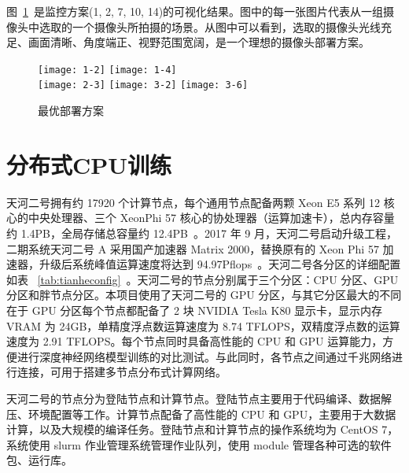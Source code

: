 图~\ref{fig:rlresult}~是监控方案(1, 2, 7, 10, 14)的可视化结果。图中的每一张图片代表从一组摄像头中选取的一个摄像头所拍摄的场景。从图中可以看到，选取的摄像头光线充足、画面清晰、角度端正、视野范围宽阔，是一个理想的摄像头部署方案。

\begin{figure}[!ht]
    \centering
    \texttt{[image: 1-2]}
    \texttt{[image: 1-4]}\\
    \texttt{[image: 2-3]}
    \texttt{[image: 3-2]}
    \texttt{[image: 3-6]}
    \caption{最优部署方案}
    \label{fig:rlresult}
\end{figure}

\section{分布式CPU训练}

天河二号拥有约 17920 个计算节点，每个通用节点配备两颗 Xeon E5 系列 12 核心的中央处理器、三个 XeonPhi 57 核心的协处理器（运算加速卡），总内存容量约 1.4PB，全局存储总容量约 12.4PB~\cite{tianhe2018config}。2017 年 9 月，天河二号启动升级工程，二期系统天河二号 A 采用国产加速器 Matrix 2000，替换原有的 Xeon Phi 57 加速器，升级后系统峰值运算速度将达到 94.97Pflops~\cite{tianhe2017summary}。天河二号各分区的详细配置如表 ~\ref{tab:tianheconfig}~。天河二号的节点分别属于三个分区：CPU 分区、GPU 分区和胖节点分区。本项目使用了天河二号的 GPU 分区，与其它分区最大的不同在于 GPU 分区每个节点都配备了 2 块 NVIDIA Tesla K80 显示卡，显示内存 VRAM 为 24GB，单精度浮点数运算速度为 8.74 TFLOPS，双精度浮点数的运算速度为 2.91 TFLOPS。每个节点同时具备高性能的 CPU 和 GPU 运算能力，方便进行深度神经网络模型训练的对比测试。与此同时，各节点之间通过千兆网络进行连接，可用于搭建多节点分布式计算网络。

天河二号的节点分为登陆节点和计算节点。登陆节点主要用于代码编译、数据解压、环境配置等工作。计算节点配备了高性能的 CPU 和 GPU，主要用于大数据计算，以及大规模的编译任务。登陆节点和计算节点的操作系统均为 CentOS 7，系统使用 slurm 作业管理系统管理作业队列，使用 module 管理各种可选的软件包、运行库。

